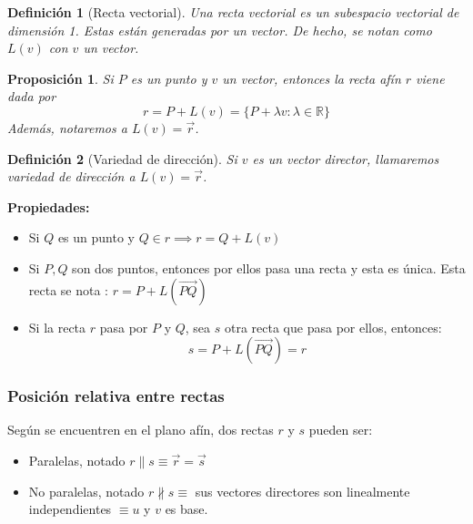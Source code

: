 \documentclass[11pt, a4paper, titlepage]{article}
\makeatletter
\renewenvironment{proof}[1][\proofname] {\vspace{-15pt}\par\pushQED{\qed}\normalfont\topsep6\p@\@plus6\p@\relax\trivlist\item[\hskip\labelsep\it#1\@addpunct{.}]\ignorespaces}{\popQED\endtrivlist\@endpefalse}
\newcommand{\R}{\mathbb{R}}
\theoremstyle{theorem-style}
\newtheorem*{nprop}{Proposición}
\theoremstyle{definition-style}
\newtheorem*{ndef}{Definición}
\theoremstyle{remark-style}
\theoremstyle{example-style}
\makeatother
\begin{document}
\begin{ndef}[Recta vectorial]
	Una recta vectorial es un subespacio vectorial de dimensión 1. Estas están generadas por un vector. De hecho, se notan como $L(v)$ con $v$ un vector.
\end{ndef}

\begin{nprop}
	Si $P$ es un punto y $v$ un vector, entonces la recta afín $r$ viene dada por 
	\[
	r = P+L(v) = \{P + \lambda v : \lambda \in \R\}
	\]
	Además, notaremos a $L(v) = \vec{r}$.
\end{nprop}
\begin{ndef}[Variedad de dirección]
	Si $v$ es un vector director, llamaremos variedad de dirección a $L(v) = \vec{r}$.
\end{ndef}

\textbf{Propiedades:}
\begin{itemize}
	\item Si $Q$ es un punto y $Q\in r \implies r = Q +L(v)$
	\item Si $P,Q$ son dos puntos, entonces por ellos pasa una recta y esta es única. Esta recta se nota : $r = P +L(\overrightarrow{PQ})$\\
	\begin{proof}
	Si la recta $r$ pasa por $P$ y $Q$, sea $s$ otra recta que pasa por ellos, entonces:
	\[
	s = P+L(\overrightarrow{PQ}) = r
	\]
\end{proof}
\end{itemize}

\subsubsection{Posición relativa entre rectas}
Según se encuentren en el plano afín, dos rectas $r$ y $s$ pueden ser:
\begin{itemize}
	\item Paralelas, notado $r\parallel s \equiv \vec{r} = \vec{s}$
	\item No paralelas, notado $r\nparallel s \equiv$  sus vectores directores son linealmente independientes $\equiv u$ y $v$ es base.
\end{itemize}
\end{document}
